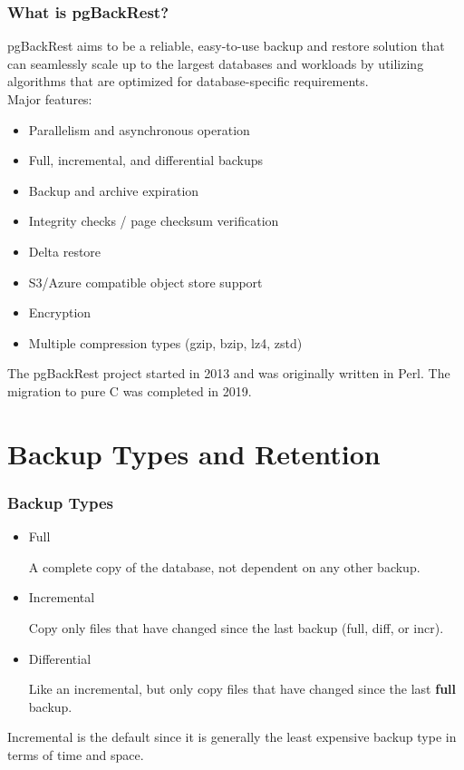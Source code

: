 \begin{frame}
    \frametitle{What is pgBackRest?}

    pgBackRest aims to be a reliable, easy-to-use backup and restore solution that can seamlessly scale up to the largest databases and workloads by utilizing algorithms that are optimized for database-specific requirements.
    \\\vspace{1em}
    Major features:

    \begin{itemize}
        \item Parallelism and asynchronous operation
        \item Full, incremental, and differential backups
        \item Backup and archive expiration
        \item Integrity checks / page checksum verification
        \item Delta restore
        \item S3/Azure compatible object store support
        \item Encryption
        \item Multiple compression types (gzip, bzip, lz4, zstd)
    \end{itemize}

    The pgBackRest project started in 2013 and was originally written in Perl. The migration to pure C was completed in 2019.
\end{frame}

\section{Backup Types and Retention}

\begin{frame}
    \frametitle{Backup Types}

    \begin{itemize}
        \item Full

        A complete copy of the database, not dependent on any other backup.

        \item Incremental

        Copy only files that have changed since the last backup (full, diff, or incr).

        \item Differential

        Like an incremental, but only copy files that have changed since the last \textbf{full} backup.
    \end{itemize}

    Incremental is the default since it is generally the least expensive backup type in terms of time and space.
\end{frame}

